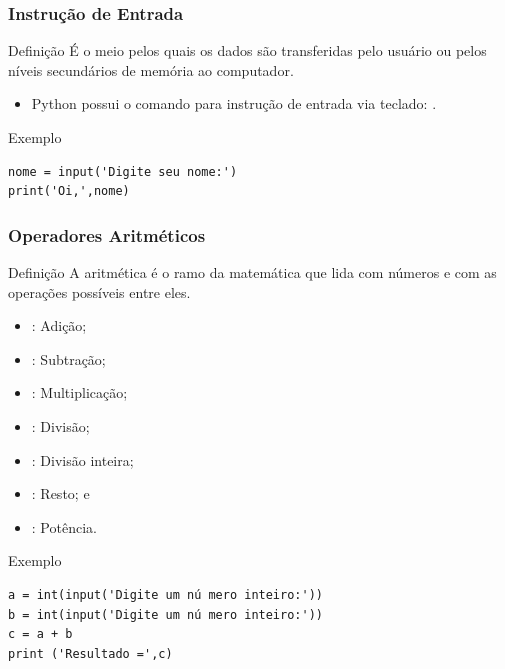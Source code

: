 \documentclass{beamer}
\begin{document}
\begin{frame}[fragile]
\frametitle{Instrução de Entrada}

\begin{block}{Definição}
É o meio pelos quais os dados são transferidas pelo usuário ou pelos níveis secundários de memória ao computador.
\end{block}\vfill

\begin{itemize}
	\item Python possui o comando para instrução de entrada via teclado: .
\end{itemize}\vfill

\begin{exampleblock}{Exemplo}
	\begin{lstlisting}
nome = input('Digite seu nome:')
print('Oi,',nome)
	\end{lstlisting}
\end{exampleblock}
\end{frame}

\begin{frame}[fragile]
\frametitle{Operadores Aritméticos}

\begin{block}{Definição}
A aritmética é o ramo da matemática que lida com números e com as operações possíveis entre eles.
\end{block} \vfill

\begin{itemize}
	\item \structure{+} : Adição;
	\item \structure{-} : Subtração;
	\item \structure{*} : Multiplicação;
	\item \structure{/}  : Divisão;
	\item \structure{//}  : Divisão inteira;
	\item \structure{\%} : Resto; e
	\item \structure{**} : Potência.
\end{itemize}\vfill

\begin{exampleblock}{Exemplo}
	\begin{lstlisting}
a = int(input('Digite um nú mero inteiro:'))
b = int(input('Digite um nú mero inteiro:'))
c = a + b
print ('Resultado =',c)
	\end{lstlisting}
\end{exampleblock}
\end{frame}
\end{document}

